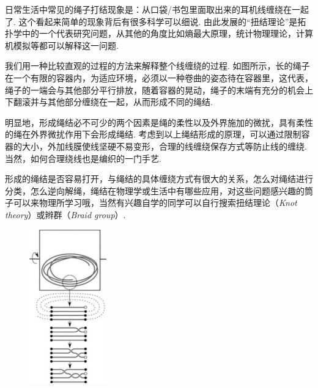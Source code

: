 \begin{multicols}{2}

\noindent{}日常生活中常见的绳子打结现象是：从口袋/书包里面取出来的耳机线缠绕在一起了. 这个看起来简单的现象背后有很多科学可以细说. 由此发展的“扭结理论”是拓扑学中的一个代表研究问题，从其他的角度比如熵最大原理，统计物理理论，计算机模拟等都可以解释这一问题. 

我们用一种比较直观的过程的方法来解释整个线缠绕的过程. 如图所示，长的绳子在一个有限的容器内，为适应环境，必须以一种卷曲的姿态待在容器里，这代表，绳子的一端会与其他部分平行排放，随着容器的晃动，绳子的末端有充分的机会上下翻滚并与其他部分缠绕在一起，从而形成不同的绳结. 

明显地，形成绳结必不可少的两个因素是绳的柔性以及外界施加的微扰，具有柔性的绳在外界微扰作用下会形成绳结. 考虑到以上绳结形成的原理，可以通过限制容器的大小，外加线膜使线坚硬不易变形，合理的线缠绕保存方式等防止线的缠绕. 当然，如何合理绕线也是编织的一门手艺. 

形成的绳结是否容易打开，与绳结的具体缠绕方式有很大的关系，怎么对绳结进行分类，怎么逆向解绳，绳结在物理学或生活中有哪些应用，对这些问题感兴趣的筒子可以来物理所学习哦，当然有兴趣自学的同学可以自行搜索扭结理论（\textit{Knot theory}）或辫群（\textit{Braid group}）. 

 \begin{figure}[H]
        \centering
      \includegraphics[angle=90,width=0.7\linewidth]{IMG/201908/3.jpg}
    \end{figure}
    

\end{multicols}
